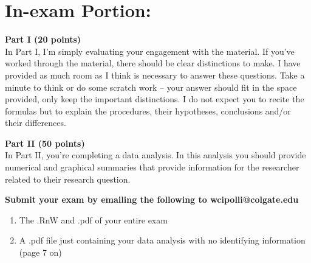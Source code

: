 \documentclass{article}
\begin{document}
\section{In-exam Portion:}

\noindent \textbf{Part I (20 points)}\\
In Part I, I'm simply evaluating your engagement with the material. If you've worked
through the material, there should be clear distinctions to make. I have provided
as much room as I think is necessary to answer these questions. Take a minute to think
or do some scratch work -- your answer should fit in the space provided, only keep 
the important distinctions. I do not expect you to recite the formulas but to explain 
the procedures, their hypotheses, conclusions and/or their differences.\\\vspace{1em}

\noindent \textbf{Part II (50 points)}\\
In Part II, you're completing a data analysis. In this analysis you should provide 
numerical and graphical summaries that provide information for the researcher
related to their research question. \\\vspace{1em}

\noindent \textbf{Submit your exam by emailing the following to wcipolli@colgate.edu}
\begin{enumerate}
  \item The .RnW and .pdf of your entire exam
  \item A .pdf file just containing your data analysis with no identifying information (page 7 on)
\end{enumerate}
\end{document}
